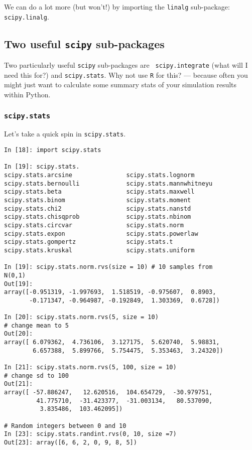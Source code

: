 We can do a lot more (but won't!) by importing the {\tt linalg} 
sub-package: {\tt scipy.linalg}. 

\subsection{Two useful {\tt scipy} sub-packages}

Two particularly useful {\tt scipy} sub-packages are {\tt 
scipy.integrate} (what will I need this for?) and {\tt scipy.stats}. 
Why not use {\tt R} for this? --- because often you might just want to 
calculate some summary stats of your simulation results within Python.  

\subsubsection{{\tt scipy.stats}}
Let's take a quick spin in {\tt scipy.stats}.

\begin{lstlisting}
In [18]: import scipy.stats

In [19]: scipy.stats.
scipy.stats.arcsine               scipy.stats.lognorm
scipy.stats.bernoulli             scipy.stats.mannwhitneyu
scipy.stats.beta                  scipy.stats.maxwell
scipy.stats.binom                 scipy.stats.moment
scipy.stats.chi2                  scipy.stats.nanstd
scipy.stats.chisqprob             scipy.stats.nbinom
scipy.stats.circvar               scipy.stats.norm
scipy.stats.expon                 scipy.stats.powerlaw
scipy.stats.gompertz              scipy.stats.t
scipy.stats.kruskal               scipy.stats.uniform

In [19]: scipy.stats.norm.rvs(size = 10) # 10 samples from 
N(0,1)
Out[19]: 
array([-0.951319, -1.997693,  1.518519, -0.975607,  0.8903,
       -0.171347, -0.964987, -0.192849,  1.303369,  0.6728])

In [20]: scipy.stats.norm.rvs(5, size = 10) 
# change mean to 5
Out[20]: 
array([ 6.079362,  4.736106,  3.127175,  5.620740,  5.98831,
        6.657388,  5.899766,  5.754475,  5.353463,  3.24320])

In [21]: scipy.stats.norm.rvs(5, 100, size = 10) 
# change sd to 100
Out[21]: 
array([ -57.886247,   12.620516,  104.654729,  -30.979751,
         41.775710,  -31.423377,  -31.003134,   80.537090,
          3.835486,  103.462095])

# Random integers between 0 and 10
In [23]: scipy.stats.randint.rvs(0, 10, size =7)
Out[23]: array([6, 6, 2, 0, 9, 8, 5])
\end{lstlisting}

